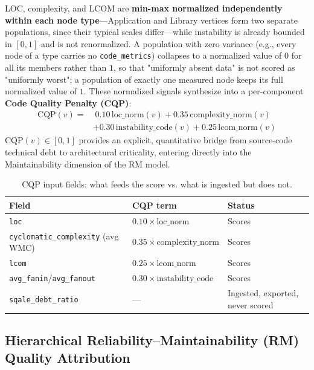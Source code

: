 LOC, complexity, and LCOM are \textbf{min-max normalized independently within each node type}---Application and Library vertices form two separate populations, since their typical scales differ---while instability is already bounded in $[0,1]$ and is not renormalized. A population with zero variance (e.g., every node of a type carries no \texttt{code\_metrics}) collapses to a normalized value of $0$ for all its members rather than $1$, so that "uniformly absent data" is not scored as "uniformly worst"; a population of exactly one measured node keeps its full normalized value of $1$. These normalized signals synthesize into a per-component \textbf{Code Quality Penalty (CQP)}:
\begin{equation}
\begin{aligned}
\mathrm{CQP}(v) = & \; 0.10\,\text{loc\_norm}(v) + 0.35\,\text{complexity\_norm}(v) \\
                  & + 0.30\,\text{instability\_code}(v) + 0.25\,\text{lcom\_norm}(v)
\end{aligned}
\end{equation}
$\mathrm{CQP}(v) \in [0,1]$ provides an explicit, quantitative bridge from source-code technical debt to architectural criticality, entering directly into the Maintainability dimension of the RM model.

\begin{table}[htbp]
\centering
\footnotesize
\caption{CQP input fields: what feeds the score vs. what is ingested but does not.}
\label{tab:cqp_gotcha}
\begin{tabular}{lll}
\toprule
\textbf{Field} & \textbf{CQP term} & \textbf{Status} \\
\midrule
\texttt{loc} & $0.10\times\text{loc\_norm}$ & Scores \\
\texttt{cyclomatic\_complexity} (avg WMC) & $0.35\times\text{complexity\_norm}$ & Scores \\
\texttt{lcom} & $0.25\times\text{lcom\_norm}$ & Scores \\
\texttt{avg\_fanin}/\texttt{avg\_fanout} & $0.30\times\text{instability\_code}$ & Scores \\
\texttt{sqale\_debt\_ratio} & --- & Ingested, exported, never scored \\
\bottomrule
\end{tabular}
\end{table}

\subsection{Hierarchical Reliability--Maintainability (RM) Quality Attribution}
\label{sec:model:rm}

